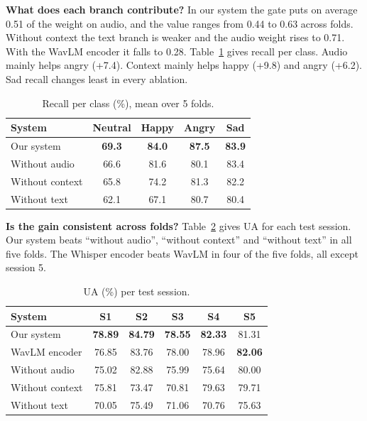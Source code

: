 \documentclass[conference]{IEEEtran}
\newcommand{\tabstyle}{\footnotesize\setlength{\tabcolsep}{3.5pt}}
\begin{document}
\textbf{What does each branch contribute?} In our system the gate puts on average 0.51 of the weight on audio, and
the value ranges from 0.44 to 0.63 across folds. Without context the text branch is weaker and the audio weight rises
to 0.71. With the WavLM encoder it falls to 0.28. Table~\ref{tab:recall} gives recall per class. Audio mainly helps
angry (+7.4). Context mainly helps happy (+9.8) and angry (+6.2). Sad recall changes least in every ablation.

\begin{table}[!t]
\centering
\caption{Recall per class (\%), mean over 5 folds.}
\label{tab:recall}
\tabstyle
\begin{tabular}{lcccc}
\toprule
System & Neutral & Happy & Angry & Sad \\
\midrule
Our system & \textbf{69.3} & \textbf{84.0} & \textbf{87.5} & \textbf{83.9} \\
Without audio & 66.6 & 81.6 & 80.1 & 83.4 \\
Without context & 65.8 & 74.2 & 81.3 & 82.2 \\
Without text & 62.1 & 67.1 & 80.7 & 80.4 \\
\bottomrule
\end{tabular}
\end{table}

\textbf{Is the gain consistent across folds?} Table~\ref{tab:folds} gives UA for each test session. Our system beats
``without audio'', ``without context'' and ``without text'' in all five folds. The Whisper encoder beats WavLM in
four of the five folds, all except session 5.

\begin{table}[!t]
\centering
\caption{UA (\%) per test session.}
\label{tab:folds}
\tabstyle
\begin{tabular}{lccccc}
\toprule
System & S1 & S2 & S3 & S4 & S5 \\
\midrule
Our system & \textbf{78.89} & \textbf{84.79} & \textbf{78.55} & \textbf{82.33} & 81.31 \\
WavLM encoder & 76.85 & 83.76 & 78.00 & 78.96 & \textbf{82.06} \\
Without audio & 75.02 & 82.88 & 75.99 & 75.64 & 80.00 \\
Without context & 75.81 & 73.47 & 70.81 & 79.63 & 79.71 \\
Without text & 70.05 & 75.49 & 71.06 & 70.76 & 75.63 \\
\bottomrule
\end{tabular}
\end{table}
\end{document}
